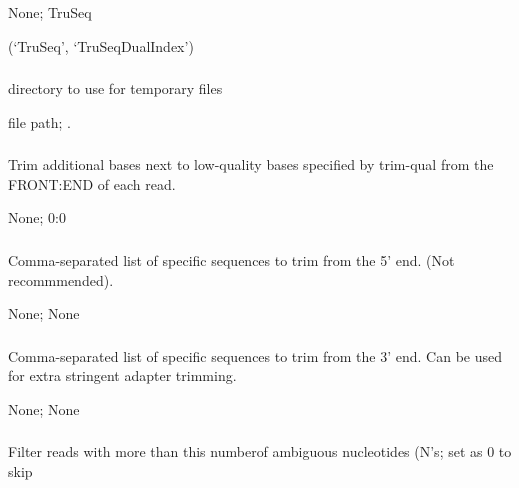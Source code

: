 \documentclass[letterpaper,10pt,english]{sphinxmanual}
\begin{document}
 None;  TruSeq

 (‘TruSeq’, ‘TruSeqDualIndex’)


\subsubsection{}
\label{\detokenize{prog_desc:temp-dir}}
 directory to use for temporary files

 file path;  .


\subsubsection{}
\label{\detokenize{prog_desc:trim-qual-pad}}
 Trim additional bases next to low-quality bases specified by \textendash{}trim-qual from the FRONT:END of each read.

 None;  0:0


\subsubsection{}
\label{\detokenize{prog_desc:y-trim-pattern-5}}
 Comma-separated list of specific sequences to trim from the 5’ end. (Not recommmended).

 None;  None


\subsubsection{}
\label{\detokenize{prog_desc:z-trim-pattern-3}}
 Comma-separated list of specific sequences to trim from the 3’ end. Can be used for extra stringent adapter trimming.

 None;  None


\subsubsection{}
\label{\detokenize{prog_desc:a-filter-ambig}}
 Filter reads with more than this numberof ambiguous nucleotides (N’s; set as 0 to skip
\end{document}
